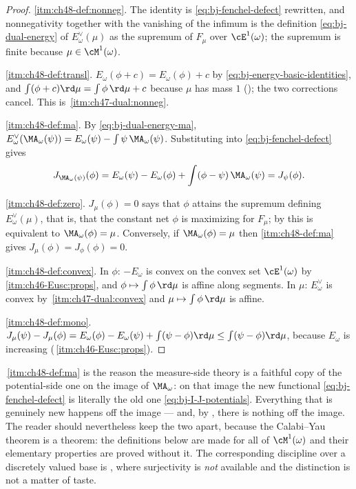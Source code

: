 \begin{proof}
\cref{itm:ch48-def:nonneg}.  The identity is
\eqref{eq:bj-fenchel-defect} rewritten, and nonnegativity together with the
vanishing of the infimum is the definition
\eqref{eq:bj-dual-energy} of $E^\vee_\omega(\mu)$ as the supremum of
$F_\mu$ over $\cE^1(\omega)$; the supremum is finite because
$\mu\in\cM^1(\omega)$.

\cref{itm:ch48-def:transl}.  $E_\omega(\phi+c)=E_\omega(\phi)+c$ by
\eqref{eq:bj-energy-basic-identities}, and $\int(\phi+c)\rd\mu
=\int\phi\,\rd\mu+c$ because $\mu$ has mass $1$
(); the two corrections cancel.  This is
\,\cref{itm:ch47-dual:nonneg}.

\cref{itm:ch48-def:ma}.  By \eqref{eq:bj-dual-energy-ma},
$E^\vee_\omega(\MA_\omega(\psi))=E_\omega(\psi)-\int\psi\,\MA_\omega(\psi)$.
Substituting into \eqref{eq:bj-fenchel-defect} gives
\[
 J_{\MA_\omega(\psi)}(\phi)
 =E_\omega(\psi)-E_\omega(\phi)
   +\int(\phi-\psi)\,\MA_\omega(\psi)
 =J_\psi(\phi).
\]

\cref{itm:ch48-def:zero}.  $J_\mu(\phi)=0$ says that $\phi$ attains the
supremum defining $E^\vee_\omega(\mu)$, that is, that the constant net
$\phi$ is maximizing for $F_\mu$; by
 this is equivalent to
$\MA_\omega(\phi)=\mu$.  Conversely, if $\MA_\omega(\phi)=\mu$ then
\cref{itm:ch48-def:ma} gives $J_\mu(\phi)=J_\phi(\phi)=0$.

\cref{itm:ch48-def:convex}.  In $\phi$: $-E_\omega$ is convex on the
convex set $\cE^1(\omega)$ by
\,\cref{itm:ch46-Eusc:props}, and
$\phi\mapsto\int\phi\,\rd\mu$ is affine along segments.  In $\mu$:
$E^\vee_\omega$ is convex by
\,\cref{itm:ch47-dual:convex} and
$\mu\mapsto\int\phi\,\rd\mu$ is affine.

\cref{itm:ch48-def:mono}.  $J_\mu(\psi)-J_\mu(\phi)
=E_\omega(\phi)-E_\omega(\psi)+\int(\psi-\phi)\rd\mu
\le\int(\psi-\phi)\rd\mu$, because $E_\omega$ is increasing
(\,\cref{itm:ch46-Eusc:props}).
\end{proof}

\begin{remark}
\label{rem:ch48-defect-reading}
\,\cref{itm:ch48-def:ma} is the reason the
measure-side theory is a faithful copy of the potential-side one on the
image of $\MA_\omega$: on that image the new functional
\eqref{eq:bj-fenchel-defect} is literally the old one
\eqref{eq:bj-I-J-potentials}.  Everything that is genuinely new happens off
the image --- and, by , there is nothing off the
image.  The reader should nevertheless keep the two apart, because the
Calabi--Yau theorem is a theorem: the definitions below are made for all of
$\cM^1(\omega)$ and their elementary properties are proved without it.
The corresponding discipline over a discretely valued base is
, where surjectivity is
\emph{not} available and the distinction is not a matter of taste.
\end{remark}

